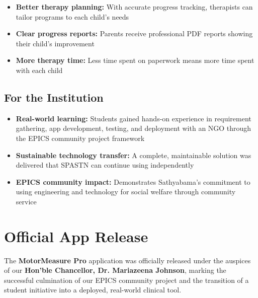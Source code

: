 \documentclass[11pt,a4paper]{article}
\begin{document}
\begin{itemize}[leftmargin=2em]
    \item \textbf{Better therapy planning:} With accurate progress tracking, therapists can tailor programs to each child's needs
    \item \textbf{Clear progress reports:} Parents receive professional PDF reports showing their child's improvement
    \item \textbf{More therapy time:} Less time spent on paperwork means more time spent with each child
\end{itemize}

\subsection{For the Institution}

\begin{itemize}[leftmargin=2em]
    \item \textbf{Real-world learning:} Students gained hands-on experience in requirement gathering, app development, testing, and deployment with an NGO through the EPICS community project framework
    \item \textbf{Sustainable technology transfer:} A complete, maintainable solution was delivered that SPASTN can continue using independently
    \item \textbf{EPICS community impact:} Demonstrates Sathyabama's commitment to using engineering and technology for social welfare through community service
\end{itemize}

\section{Official App Release}

The \textbf{MotorMeasure Pro} application was officially released under the auspices of our \textbf{Hon'ble Chancellor, Dr. Mariazeena Johnson}, marking the successful culmination of our EPICS community project and the transition of a student initiative into a deployed, real-world clinical tool.
\end{document}
